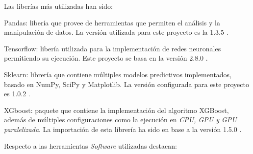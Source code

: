             Las liberías más utilizadas han sido:

            \begin{description}

                \item Pandas: libería que provee de herramientas que permiten el análisis y la manipulación de datos. La versión utilizada para este proyecto es la 1.3.5 \cite{Pandas}.

                \item Tensorflow: libería utilizada para la implementación de redes neuronales permitiendo su ejecución. Este proyecto se basa en la versión 2.8.0 \cite{Tensorflow}.

                \item Sklearn: librería que contiene múltiples modelos predictivos implementados, basado en NumPy, SciPy y Matplotlib. La versión configurada para este proyecto es 1.0.2 \cite{Scikit-Learn}.

                \item XGboost: paquete que contiene la implementación del algoritmo XGBoost, además de múltiples configuraciones como la ejecución en \textit{CPU, GPU y GPU paralelizada}. La importación de esta librería ha sido en base a la versión 1.5.0 \cite{XGBoostLibrary}.

            \end{description}

            Respecto a las herramientas \textit{Software} utilizadas destacan:

